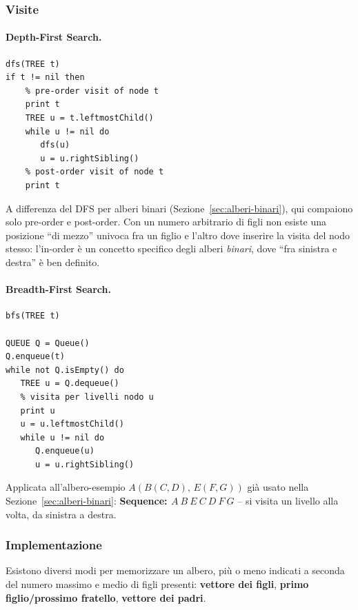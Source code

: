 \documentclass[12pt, a4paper]{article}
\begin{document}
\subsubsection{Visite}

\paragraph{Depth-First Search.}
\begin{verbatim}
dfs(TREE t)
if t != nil then
    % pre-order visit of node t
    print t
    TREE u = t.leftmostChild()
    while u != nil do
       dfs(u)
       u = u.rightSibling()
    % post-order visit of node t
    print t
\end{verbatim}

\begin{tcolorbox}[colback=lightergray!5, colframe=tocsubsec, title=\textbf{Nota mia (non nella slide): perché manca l'in-order?}]
A differenza del DFS per alberi binari (Sezione~\ref{sec:alberi-binari}), qui compaiono solo pre-order e post-order. Con un numero arbitrario di figli non esiste una posizione ``di mezzo'' univoca fra un figlio e l'altro dove inserire la visita del nodo stesso: l'in-order è un concetto specifico degli alberi \emph{binari}, dove ``fra sinistra e destra'' è ben definito.
\end{tcolorbox}

\paragraph{Breadth-First Search.}
\begin{verbatim}
bfs(TREE t)

QUEUE Q = Queue()
Q.enqueue(t)
while not Q.isEmpty() do
   TREE u = Q.dequeue()
   % visita per livelli nodo u
   print u
   u = u.leftmostChild()
   while u != nil do
      Q.enqueue(u)
      u = u.rightSibling()
\end{verbatim}
Applicata all'albero-esempio $A(B(C,D),\,E(F,G))$ già usato nella Sezione~\ref{sec:alberi-binari}: \textbf{Sequence: $A\ B\ E\ C\ D\ F\ G$} -- si visita un livello alla volta, da sinistra a destra.

\subsubsection{Implementazione}

Esistono diversi modi per memorizzare un albero, più o meno indicati a seconda del numero massimo e medio di figli presenti: \textbf{vettore dei figli}, \textbf{primo figlio/prossimo fratello}, \textbf{vettore dei padri}.
\end{document}
